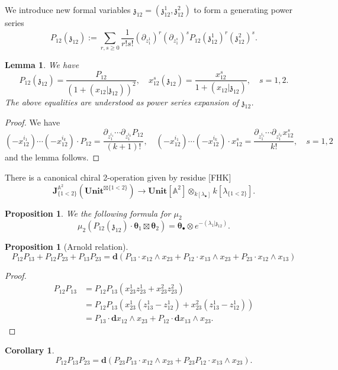 \documentclass[11pt]{amsart}
\newtheorem{cor}[thm]{Corollary}
\newtheorem{lem}[thm]{Lemma}
\newtheorem{prop}[thm]{Proposition}
\theoremstyle{definition}
\theoremstyle{remark}
\numberwithin{equation}{section}
\begin{document}
We introduce new formal variables $\mathfrak{z}_{12}=(\mathfrak{z}_{12}^1,\mathfrak{z}^2_{12})$ to form a generating power series
$$
P_{12}(\mathfrak{z}_{12}):=\sum_{r,s\geq 0}\frac{1}{r!s!}(\partial_{z^1_1})^r(\partial_{z^s_1})^sP_{12}(\mathfrak{z}^1_{12})^r(\mathfrak{z}^2_{12})^s.
$$

\begin{lem}
  We have
  $$
  P_{12}(\mathfrak{z}_{12})=\frac{P_{12}}{\left(1+(x_{12}|\mathfrak{z}_{12})\right)^2},\quad x^s_{12}(\mathfrak{z}_{12})=\frac{x^s_{12}}{1+(x_{12}|\mathfrak{z}_{12})},\quad s=1,2.
  $$
  The above equalities are understood as power series expansion of $\mathfrak{z}_{12}$.
\end{lem}

\begin{proof}
  We have
  $$
  (-x^{i_1}_{12})\cdots (-x^{i_k}_{12})\cdot P_{12}=\frac{\partial_{z^{i_1}_1}\cdots \partial_{z^{i_k}_1}P_{12}}{  (k+1)!},\quad   (-x^{i_1}_{12})\cdots (-x^{i_k}_{12})\cdot x^s_{12}=\frac{\partial_{z^{i_1}_1}\cdots \partial_{z^{i_k}_1}x^s_{12}}{  k!},\quad s=1,2
  $$
  and the lemma follows.
\end{proof}

There is a canonical chiral 2-operation  given by residue [FHK]
$$
\mathbf{J}^{\mathbb{A}^2}_{\{1<2\}}(\mathbf{Unit}^{\boxtimes\{1<2\} })\rightarrow \mathbf{Unit}[\mathbb{A}^2]\otimes_{k[\lambda_{\bullet}]}k[\lambda_{\{1<2\}}].
$$

\begin{prop}
We the following formula for $\mu_2$
$$
\mu_2\left(P_{12}(\mathfrak{z}_{12})\cdot  \boldsymbol{\theta}_1\boxtimes  \boldsymbol{\theta}_2\right)=\boldsymbol{\theta}_{\bullet}\otimes e^{-(\lambda_1|\mathfrak{z}_{12})}.
$$
\end{prop}

\begin{prop}[Arnold relation]
  $$
  P_{12}P_{13}+P_{12}P_{23}+P_{13}P_{23}=\mathbf{d}\left(P_{13}\cdot x_{12}\wedge x_{23}+P_{12}\cdot x_{13}\wedge x_{23}+P_{23}\cdot x_{12}\wedge x_{13}\right)
  $$
\end{prop}
\begin{proof}

  \begin{align*}
   P_{12}P_{13}  &=P_{12}P_{13}(x^1_{23}z^1_{23}+x^2_{23}z^2_{23})  \\
     & =P_{12}P_{13}\left(x^1_{23}(z^1_{13}-z^1_{12})+x^2_{23}(z^1_{13}-z^1_{12})\right)\\
     &=P_{13}\cdot \mathbf{d}x_{12}\wedge x_{23}+P_{12}\cdot \mathbf{d}x_{13}\wedge x_{23}.
  \end{align*}
\end{proof}
\begin{cor}\label{RecursiveLemma}
  $$
  P_{12}P_{13}P_{23}=\mathbf{d}\left(P_{23}P_{13}\cdot x_{12}\wedge x_{23}+P_{23}P_{12}\cdot x_{13}\wedge x_{23}\right).
  $$
\end{cor}
\end{document}
